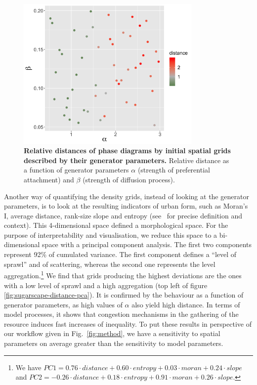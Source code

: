 \documentclass{JASSS}
\begin{document}
\begin{figure}[!t]
\centering
	\includegraphics[width=0.8\textwidth]{figures/Fig4.png}
\caption{\textbf{Relative distances of phase diagrams by initial spatial grids described by their generator parameters.} Relative distance as a function of generator parameters $\alpha$ (strength of preferential attachment) and $\beta$ (strength of diffusion process).}
\label{fig:sugarscape-distance-meta}
\end{figure}

Another way of quantifying the density grids, instead of looking at the generator parameters, is to look at the resulting indicators of urban form, such as Moran's I, average distance, rank-size slope and entropy (see~\cite{LeNechet2015} for precise definition and context). This 4-dimensional space defined a morphological space. For the purpose of interpretability and visualisation, we reduce this space to a bi-dimensional space with a principal component analysis. The first two components represent 92\% of cumulated variance. The first component defines a ``level of sprawl'' and of scattering, whereas the second one represents the level aggregation.\footnote{We have $PC1 = 0.76\cdot distance + 0.60\cdot entropy + 0.03\cdot moran + 0.24\cdot slope$ and $PC2 = -0.26\cdot distance + 0.18\cdot entropy + 0.91\cdot moran + 0.26\cdot slope$.} We find that grids producing the highest deviations are the ones with a low level of sprawl and a high aggregation (top left of figure \ref{fig:sugarscape-distance-pca}). It is confirmed by the behaviour as a function of generator parameters, as high values of $\alpha$ also yield high distance. In terms of model processes, it shows that congestion mechanisms in the gathering of the resource induces fast increases of inequality. To put these results in perspective of our workflow given in Fig.~\ref{fig:method}, we have a sensitivity to spatial parameters on average greater than the sensitivity to model parameters.
\end{document}
